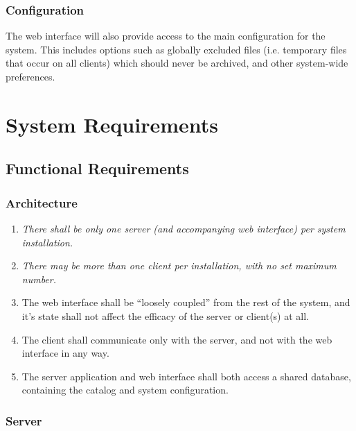 \subsubsection{Configuration}

The web interface will also provide access to the main configuration for the
system. This includes options such as globally excluded files (i.e. temporary
files that occur on all clients) which should never be archived, and other
system-wide preferences.

\section{System Requirements}

\subsection{Functional Requirements}

\subsubsection{Architecture}

\begin{enumerate}
    \item \emph{There shall be only one server (and accompanying web
        interface) per system installation.}
    \item \emph{There may be more than one client per installation,
        with no set maximum number.}
    \item The web interface shall be ``loosely coupled'' from the rest
        of the system, and it's state shall not affect the efficacy of
        the server or client(s) at all.
    \item The client shall communicate only with the server, and not
        with the web interface in any way.
    \item The server application and web interface shall both access
        a shared database, containing the catalog and system
        configuration.
\end{enumerate}

\subsubsection{Server}

